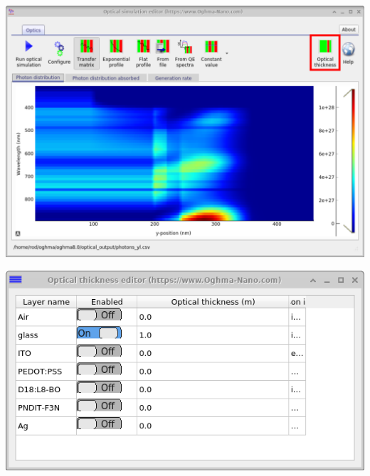 \begin{minipage}{0.5\textwidth}
	\centering
	\includegraphics[width=\linewidth,height=0.8\linewidth]{./images/transfer_matrix/thickness.png}
	\label{fig:optical_thickness}
\end{minipage}
\hspace{4pt}
\begin{minipage}[]{0.5\linewidth}
	\centering
	\includegraphics[width=\linewidth,height=0.6\linewidth]{./images/transfer_matrix/layer_thickness.png}
	\label{fig:optical_thickness_window}
\end{minipage}


\pagebreak
